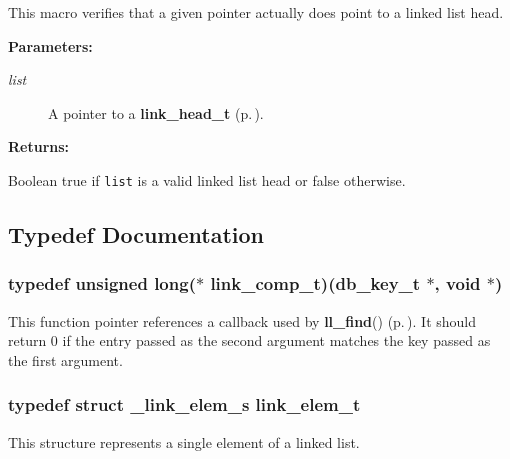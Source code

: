  This macro verifies that a given pointer actually does point to a linked list head.\begin{Desc}
\item[{\bf Parameters: }]\par
\begin{description}
\item[
{\em list}]A pointer to a {\bf link\_\-head\_\-t} {\rm (p.\,\pageref{group__dbprim__link_a0})}.

\end{description}
\end{Desc}
\begin{Desc}
\item[{\bf Returns: }]\par
Boolean true if {\tt list} is a valid linked list head or false otherwise. \end{Desc}


\subsection{Typedef Documentation}
\subsubsection{\setlength{\rightskip}{0pt plus 5cm}typedef unsigned long($\ast$ link\_\-comp\_\-t)({\bf db\_\-key\_\-t} $\ast$, void $\ast$)}\label{group__dbprim__link_a3}




 This function pointer references a callback used by {\bf ll\_\-find}() {\rm (p.\,\pageref{group__dbprim__link_a9})}. It should return 0 if the entry passed as the second argument matches the key passed as the first argument. 
\subsubsection{\setlength{\rightskip}{0pt plus 5cm}typedef struct \_\-link\_\-elem\_\-s link\_\-elem\_\-t}\label{group__dbprim__link_a1}




 This structure represents a single element of a linked list. 
